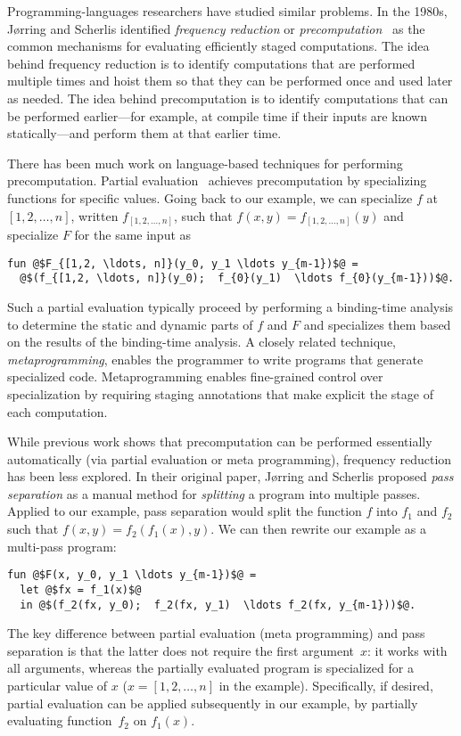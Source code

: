 Programming-languages researchers have studied similar problems. In
the 1980s, J{\o}rring and Scherlis identified {\em frequency
  reduction} or {\em precomputation}~\cite{JS86-staging} as the common
mechanisms for evaluating efficiently staged computations.  The idea
behind frequency reduction is to identify computations that are
performed multiple times and hoist them so that they can be performed
once and used later as needed.  The idea behind precomputation is to
identify computations that can be performed earlier---for example, at
compile time if their inputs are known statically---and perform them
at that earlier time.

There has been much work on language-based techniques for performing
precomputation. Partial evaluation~\cite{} achieves precomputation by
specializing functions for specific values.  Going back to our
example, we can specialize $f$ at $[1,2, \ldots, n]$, written
$f_{[1,2, \ldots, n]}$, such that $f(x,y) = f_{[1,2, \ldots, n]}(y)$
and specialize $F$ for the same input as
\begin{lstlisting}
fun @$F_{[1,2, \ldots, n]}(y_0, y_1 \ldots y_{m-1})$@ = 
  @$(f_{[1,2, \ldots, n]}(y_0);  f_{0}(y_1)  \ldots f_{0}(y_{m-1}))$@.
\end{lstlisting}
%
Such a partial evaluation typically proceed by performing a
binding-time analysis to determine the static and dynamic parts of $f$
and $F$ and specializes them based on the results of the binding-time
analysis. A closely related technique, {\em metaprogramming}, enables
the programmer to write programs that generate specialized code.
Metaprogramming enables fine-grained control over specialization by
requiring staging annotations that make explicit the stage of each
computation.


While previous work shows that precomputation can be performed
essentially automatically (via partial evaluation or meta
programming), frequency reduction has been less explored.  In their
original paper, J{\o}rring and Scherlis proposed {\em pass separation}
as a manual method for {\em splitting} a program into multiple passes.
%
Applied to our example, pass separation would split the function $f$
into $f_1$ and $f_2$ such that $f(x,y) = f_2(f_1(x),y)$.  We can then
rewrite our example as a multi-pass program:
%
\begin{lstlisting}
fun @$F(x, y_0, y_1 \ldots y_{m-1})$@ = 
  let @$fx = f_1(x)$@
  in @$(f_2(fx, y_0);  f_2(fx, y_1)  \ldots f_2(fx, y_{m-1}))$@.
\end{lstlisting}
%
The key difference between partial evaluation (meta programming) and
pass separation is that the latter does not require the first
argument~$x$: it works with all arguments, whereas the partially
evaluated program is specialized for a particular value of $x$ ($x =
[1,2, \ldots, n]$ in the example). Specifically, if desired, partial
evaluation can be applied subsequently in our example, by partially
evaluating function~$f_2$ on $f_1(x)$.

